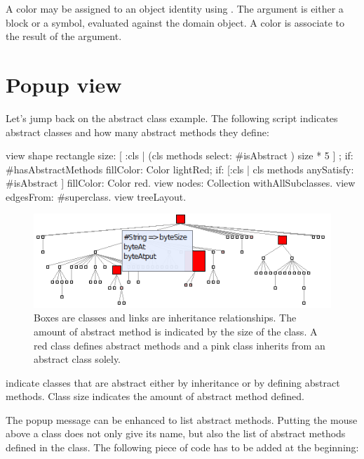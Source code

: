 \documentclass[a4paper,10pt,twoside]{book}
\begin{document}
A color may be assigned to an object identity using . The argument is either a block or a symbol, evaluated against the domain object. A color is associate to the result of the argument.


\section{Popup view}

Let's jump back on the abstract class example. The following script indicates abstract classes and how many abstract methods they define:

\newpage
\begin{code}{}
view shape rectangle
	size: [ :cls | (cls methods select:  #isAbstract ) size * 5 ] ;
	if: #hasAbstractMethods fillColor: Color lightRed;
	if: [:cls | cls methods anySatisfy: #isAbstract ] fillColor: Color red.
view nodes: Collection withAllSubclasses.
view edgesFrom: #superclass.
view treeLayout.
\end{code}

\begin{figure}[htbp]
\centerline{\includegraphics[width=0.6\linewidth]{abstractClasses2.png}}
\caption{Boxes are classes and links are inheritance relationships. The amount of abstract method is indicated by the size of the class. A red class defines abstract methods and a pink class inherits from an abstract class solely.}
\label{fig:abstractClasses2}
\end{figure}

 indicate classes that are abstract either by inheritance or by defining abstract methods. Class size indicates the amount of abstract method defined. 

The popup message can be enhanced to list abstract methods. Putting the mouse above a class does not only give its name, but also the list of abstract methods defined in the class. The following piece of code has to be added at the beginning:

\end{document}
